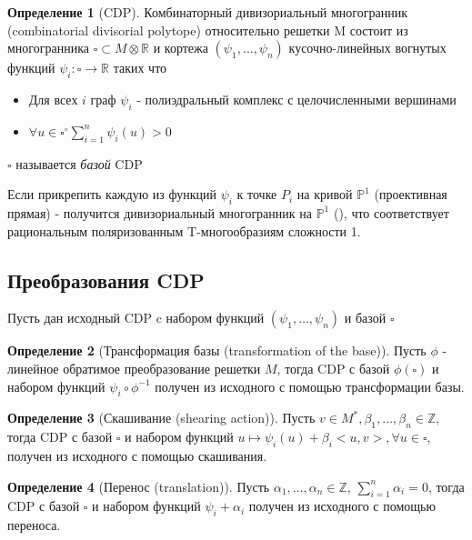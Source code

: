 \documentclass[16pt]{article}
\theoremstyle{definition}
\newtheorem{definition}{Определение}[section]
\begin{document}
\begin{definition}[CDP] 
Комбинаторный дивизориальный многогранник (combinatorial divisorial polytope) относительно решетки M состоит из многогранника $\square \subset M \otimes \mathds{R}$ и кортежа $(\psi_1, \dots, \psi_n)$ кусочно-линейных вогнутых функций $\psi_i: \square \rightarrow \mathds{R}$ таких что
\begin{itemize}
	\item[1] Для всех $i$ граф $\psi_i$ - полиэдральный комплекс с целочисленными вершинами
	\item[2] $\forall u \in \square^{\circ} \sum_{i=1}^n\psi_i(u) > 0$
\end{itemize}
$\square$ называется \emph{базой} CDP
\end{definition}

Если прикрепить каждую из функций $\psi_i$ к точке $P_i$ на кривой $\mathds{P}^1$ (проективная прямая) - получится дивизориальный многогранник на $\mathds{P}^1$ (\cite{main}), что соответствует рациональным поляризованным T-многообразиям сложности 1.

\subsection{Преобразования CDP}
Пусть дан исходный CDP c набором функций $(\psi_1, \dots, \psi_n)$ и базой $\square$

\begin{definition}[Трансформация базы (transformation of the base)]
Пусть $\phi$ - линейное обратимое преобразование решетки $M$, тогда CDP с базой $\phi(\square)$ и набором функций 
$\psi_i \circ \phi^{-1}$ получен из исходного с помощью  трансформации базы.
\end{definition}

\begin{definition}[Скашивание (shearing action)]
Пусть $v \in M^*, \beta_1, \dots, \beta_n \in \mathds{Z}$, тогда CDP с базой $\square$ и набором функций $u \mapsto
 \psi_i(u) + \beta_i<u, v>, \forall u \in \square$, получен из исходного с помощью скашивания.
\end{definition}

\begin{definition}[Перенос (translation)]
Пусть $\alpha_1, \dots, \alpha_n \in \mathds{Z}
$, $\sum_{i=1}^n \alpha_i = 0$, тогда CDP с базой $\square$ и набором функций $\psi_i + \alpha_i$ получен из исходного с помощью переноса.
\end{definition}
\end{document}
